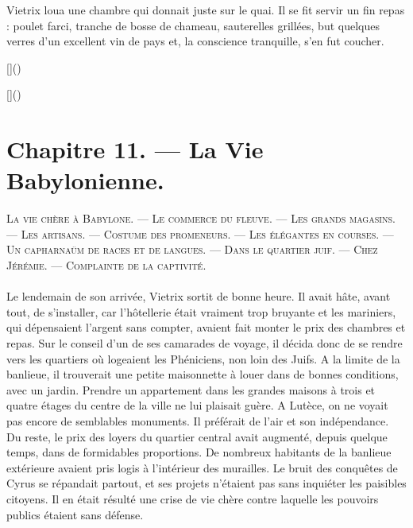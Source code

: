 \documentclass[a4paper, 11pt, oneside, polutonikogreek, french]{article}
\begin{document}
Vietrix loua une chambre qui donnait juste sur le quai. Il se fit servir un fin repas : poulet farci, tranche de bosse de chameau, sauterelles grillées, but quelques verres d'un excellent vin de pays et, la conscience tranquille, s'en fut coucher.

[]()

[]()
\clearpage
\section{Chapitre 11. --- La Vie Babylonienne.}
\begin{center}
\scshape
\small
La vie chère à Babylone. --- Le commerce du fleuve. --- Les grands magasins. --- Les artisans. --- Costume des promeneurs. --- Les élégantes en courses. --- Un capharnaüm de races et de langues. --- Dans le quartier juif. --- Chez Jérémie. --- Complainte de la captivité.
\end{center}
\paragraph{}
Le lendemain de son arrivée, Vietrix sortit de bonne heure. Il avait hâte, avant tout, de s'installer, car l'hôtellerie était vraiment trop bruyante et les mariniers, qui dépensaient l'argent sans compter, avaient fait monter le prix des chambres et repas. Sur le conseil d'un de ses camarades de voyage, il décida donc de se rendre vers les quartiers où logeaient les Phéniciens, non loin des Juifs. A la limite de la banlieue, il trouverait une petite maisonnette à louer dans de bonnes conditions, avec un jardin. Prendre un appartement dans les grandes maisons à trois et quatre étages du centre de la ville ne lui plaisait guère. A Lutèce, on ne voyait pas encore de semblables monuments. Il préférait de l'air et son indépendance. Du reste, le prix des loyers du quartier central avait augmenté, depuis quelque temps, dans de formidables proportions. De nombreux habitants de la banlieue extérieure avaient pris logis à l'intérieur des murailles. Le bruit des conquêtes de Cyrus se répandait partout, et ses projets n'étaient pas sans inquiéter les paisibles citoyens. Il en était résulté une crise de vie chère contre laquelle les pouvoirs publics étaient sans défense.

\bigskip
\centerline{\EightStarTaper}
\centerline{\EightStarTaper\EightStarTaper}
\bigskip
\end{document}
